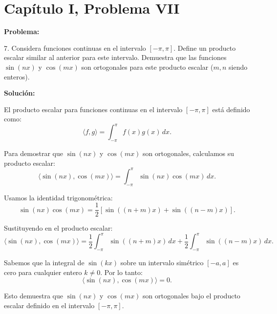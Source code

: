 \section*{Capítulo I, Problema VII}

\textbf{Problema:}

7. Considera funciones continuas en el intervalo $[-\pi, \pi]$. Define un producto escalar similar al anterior para este intervalo. Demuestra que las funciones $\sin(nx)$ y $\cos(mx)$ son ortogonales para este producto escalar ($m, n$ siendo enteros).

\textbf{Solución:}

El producto escalar para funciones continuas en el intervalo $[-\pi, \pi]$ está definido como:
\[
    \langle f, g \rangle = \int_{-\pi}^{\pi} f(x)g(x) \, dx.
\]

Para demostrar que $\sin(nx)$ y $\cos(mx)$ son ortogonales, calculamos su producto escalar:
\[
    \langle \sin(nx), \cos(mx) \rangle = \int_{-\pi}^{\pi} \sin(nx) \cos(mx) \, dx.
\]

Usamos la identidad trigonométrica:
\[
    \sin(nx)\cos(mx) = \frac{1}{2}\left[\sin((n+m)x) + \sin((n-m)x)\right].
\]

Sustituyendo en el producto escalar:
\[
    \langle \sin(nx), \cos(mx) \rangle = \frac{1}{2} \int_{-\pi}^{\pi} \sin((n+m)x) \, dx + \frac{1}{2} \int_{-\pi}^{\pi} \sin((n-m)x) \, dx.
\]

Sabemos que la integral de $\sin(kx)$ sobre un intervalo simétrico $[-a, a]$ es cero para cualquier entero $k \neq 0$. Por lo tanto:
\[
    \langle \sin(nx), \cos(mx) \rangle = 0.
\]

Esto demuestra que $\sin(nx)$ y $\cos(mx)$ son ortogonales bajo el producto escalar definido en el intervalo $[-\pi, \pi]$. 

